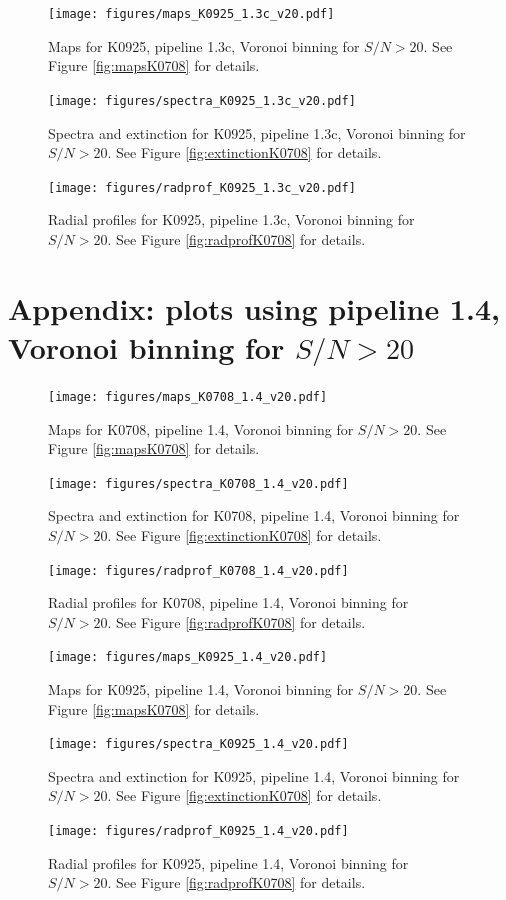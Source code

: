 \documentclass[a4paper]{article}
\begin{document}
\begin{figure}[H]
\texttt{[image: figures/maps\_K0925\_1.3c\_v20.pdf]}
\caption{Maps for K0925, pipeline 1.3c, Voronoi binning for $S/N > 20$. See
Figure \ref{fig:mapsK0708} for details.}
\end{figure}

\begin{figure}[H]
\texttt{[image: figures/spectra\_K0925\_1.3c\_v20.pdf]}
\caption{Spectra and extinction for K0925, pipeline 1.3c, Voronoi binning for
$S/N > 20$. See Figure \ref{fig:extinctionK0708} for details.}
\end{figure}

\begin{figure}[H]
\texttt{[image: figures/radprof\_K0925\_1.3c\_v20.pdf]}
\caption{Radial profiles for K0925, pipeline 1.3c, Voronoi binning for $S/N >
20$. See Figure \ref{fig:radprofK0708} for details.}
\label{fig:radprof_K0925_13c_v20}
\end{figure}

\section{Appendix: plots using pipeline 1.4, Voronoi binning for $S/N > 20$}
\label{sec:app14}

\begin{figure}[H]
\texttt{[image: figures/maps\_K0708\_1.4\_v20.pdf]}
\caption{Maps for K0708, pipeline 1.4, Voronoi binning for $S/N > 20$. See
Figure \ref{fig:mapsK0708} for details.}
\label{fig:maps_K0708_14_v20}
\end{figure}

\begin{figure}[H]
\texttt{[image: figures/spectra\_K0708\_1.4\_v20.pdf]}
\caption{Spectra and extinction for K0708, pipeline 1.4, Voronoi binning for
$S/N > 20$. See Figure \ref{fig:extinctionK0708} for details.}
\end{figure}

\begin{figure}[H]
\texttt{[image: figures/radprof\_K0708\_1.4\_v20.pdf]}
\caption{Radial profiles for K0708, pipeline 1.4, Voronoi binning for $S/N >
20$. See Figure \ref{fig:radprofK0708} for details.}
\end{figure}

\begin{figure}[H]
\texttt{[image: figures/maps\_K0925\_1.4\_v20.pdf]}
\caption{Maps for K0925, pipeline 1.4, Voronoi binning for $S/N > 20$. See
Figure \ref{fig:mapsK0708} for details.}
\end{figure}

\begin{figure}[H]
\texttt{[image: figures/spectra\_K0925\_1.4\_v20.pdf]}
\caption{Spectra and extinction for K0925, pipeline 1.4, Voronoi binning for
$S/N > 20$. See Figure \ref{fig:extinctionK0708} for details.}
\end{figure}

\begin{figure}[H]
\texttt{[image: figures/radprof\_K0925\_1.4\_v20.pdf]}
\caption{Radial profiles for K0925, pipeline 1.4, Voronoi binning for $S/N >
20$. See Figure \ref{fig:radprofK0708} for details.}
\label{fig:radprof_K0925_14_v20}
\end{figure}
\end{document}
